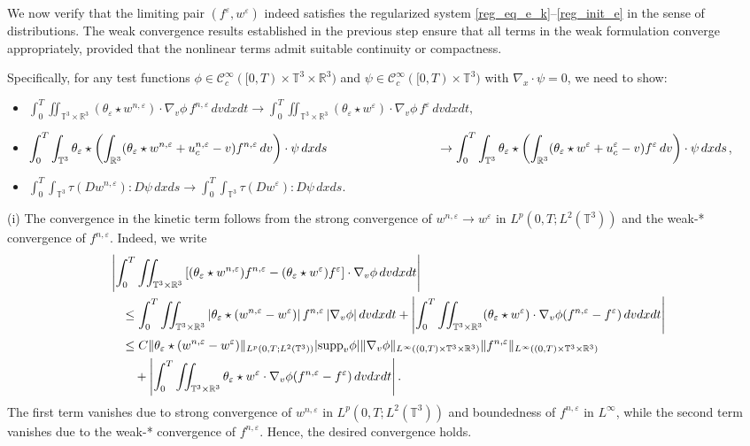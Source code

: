 \documentclass[10pt,reqno]{amsart}
\numberwithin{equation}{section}
\newcommand{\R}{\mathbb R}
\newcommand{\T}{\mathbb T}
\newcommand{\e}{\varepsilon}
\newcommand{\lt}{\left}
\newcommand{\rt}{\right}
\newcommand{\inttr}{\iint_{\T^3 \times \R^3}}
\begin{document}
We now verify that the limiting pair $(f^\e, w^\e)$ indeed satisfies the regularized system \eqref{reg_eq_e_k}--\eqref{reg_init_e} in the sense of distributions. The weak convergence results established in the previous step ensure that all terms in the weak formulation converge appropriately, provided that the nonlinear terms admit suitable continuity or compactness.

Specifically, for any test functions $\phi \in \mathcal{C}_c^\infty([0,T)\times\T^3\times\R^3)$ and $\psi \in \mathcal{C}_c^\infty([0,T)\times\T^3)$ with $\nabla_x \cdot \psi = 0$, we need to show:
\begin{itemize}
\item[(i)] \quad $\displaystyle \int_0^T \iint_{\T^3 \times \R^3} (\theta_\e \star w^{n,\e}) \cdot \nabla_v \phi \, f^{n,\e}\,dvdxdt \to \int_0^T \iint_{\T^3 \times \R^3} (\theta_\e \star w^\e) \cdot \nabla_v \phi \, f^\e \,dvdxdt,$ \\[1mm]
\item[(ii)] \quad $\displaystyle \int_0^T \int_{\T^3} \theta_\e \star \left( \int_{\R^3} (\theta_\e \star w^{n,\e} + u_c^{n,\e} - v) f^{n,\e} \,dv \right) \cdot \psi \,dxds \\
 \mbox{ } \hspace{3cm} \to \int_0^T \int_{\T^3} \theta_\e \star \left( \int_{\R^3} (\theta_\e \star w^\e + u_c^\e - v) f^\e \,dv \right) \cdot \psi \,dxds$, \\[1mm]
\item[(iii)] \quad $\displaystyle \int_0^T \int_{\T^3} \tau(D w^{n,\e}) : D\psi \,dxds \to \int_0^T \int_{\T^3} \tau(D w^\e) : D\psi \,dxds$.
\end{itemize}

\medskip

\noindent (i) The convergence in the kinetic term follows from the strong convergence of $w^{n,\e} \to w^\e$ in $L^p(0,T;L^2(\T^3))$ and the weak-* convergence of $f^{n,\e}$. Indeed, we write
\[
\begin{aligned}
&\left|\int_0^T \iint_{\T^3 \times \R^3} \left[(\theta_\e \star w^{n,\e}) f^{n,\e} - (\theta_\e \star w^\e) f^\e \right] \cdot \nabla_v \phi \,dvdxdt \right| \\
&\quad \le \int_0^T \iint_{\T^3 \times \R^3} |\theta_\e \star (w^{n,\e} - w^\e)| \, f^{n,\e} \, |\nabla_v \phi|\,dvdxdt + \left|\int_0^T \iint_{\T^3 \times \R^3} (\theta_\e \star w^\e) \cdot \nabla_v \phi (f^{n,\e} - f^\e) \,dvdxdt \right|\cr
&\quad \le C\|\theta_\e \star(w^{n,\e} -w^\e)\|_{L^p(0,T;L^2(\T^3))}|\mbox{supp}_v \phi| \|\nabla_v \phi\|_{L^\infty((0,T)\times\T^3\times\R^3)}\|f^{n,\e}\|_{L^\infty((0,T)\times\T^3\times\R^3)}\\
&\qquad + \lt|\int_0^T \inttr \theta_\e \star w^\e \cdot \nabla_v \phi (f^{n,\e} -f^\e)\,dvdxdt \rt|.
\end{aligned}
\]
The first term vanishes due to strong convergence of $w^{n,\e}$ in $L^p(0,T;L^2(\T^3))$ and boundedness of $f^{n,\e}$ in $L^\infty$, while the second term vanishes due to the weak-* convergence of $f^{n,\e}$. Hence, the desired convergence holds.
\end{document}
